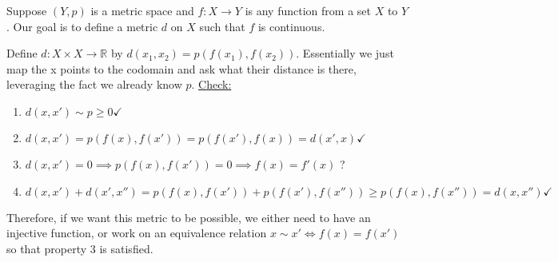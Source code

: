 \documentclass{article}
\newcommand{\RR}{\mathbb{R}}
\begin{document}
Suppose $(Y,p)$ is a metric space and $f: X \to Y$ is any function from a set $X$ to $Y$. Our goal is to
define a metric $d$ on $X$ such that $f$ is continuous. \vspace{0.5em}

Define $d: X \times X \to \RR$ by $d(x_1, x_2) = p(f(x_1), f(x_2))$. Essentially we just map the x
points to the codomain and ask what their distance is there, leveraging the fact we already know $p$.
\underline{Check:}
\begin{enumerate}
    \item $d(x,x') \sim p \geq 0 \checkmark$
    \item $d(x,x') = p(f(x), f(x')) = p(f(x'), f(x)) = d(x',x) \checkmark$
    \item $d(x,x') = 0 \implies p(f(x), f(x')) = 0 \implies f(x) = f'(x)$ ?
    \item $d(x, x') + d(x', x'') = p(f(x), f(x')) + p(f(x'), f(x'')) \geq p(f(x), f(x'')) = d(x,x'') \checkmark$
\end{enumerate}

Therefore, if we want this metric to be possible, we either need to have an injective function, or work on an equivalence
relation $x \sim x' \iff f(x) = f(x')$ so that property 3 is satisfied.
\end{document}
